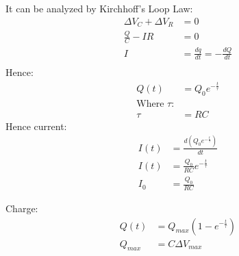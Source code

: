 \documentclass[12pt]{article}
\begin{document}
It can be analyzed by Kirchhoff's Loop Law:
\begin{align}
\Delta V_C + \Delta V_R &= 0 \\
\frac{Q}{C}-IR &=0 \\
I&=\frac{dq}{dt}=-\frac{dQ}{dt}\\
\end{align}
Hence:
\begin{align}
Q(t)&=Q_0e^{-\frac{t}{\tau}} \\
\text{Where $\tau$:}\\
\tau &= RC
\end{align}
Hence current:
\begin{align}
I(t)&=\frac{d(Q_0e^{-\frac{t}{\tau}})}{dt} \\
I(t)&=\frac{Q_0}{RC}e^{-\frac{t}{\tau}} \\
I_0&=\frac{Q_0}{RC}
\end{align}

Charge:
\begin{align}
Q(t)&=Q_{max}(1-e^{-\frac{t}{\tau}})  \\
Q_{max}&=C \Delta V_{max}
\end{align}
\end{document}
